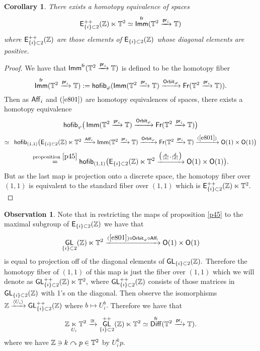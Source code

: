 \documentclass{amsart}
\newtheorem{cor}[theorem]{Corollary}
\theoremstyle{definition}
\newtheorem{observation}[theorem]{Observation}
\theoremstyle{remark}
\DeclareMathOperator{\pr}{\mathsf{pr}}
\newcommand{\lacts}{\curvearrowright}
\DeclareMathOperator{\Diff}{{\sf Diff}}
\DeclareMathOperator{\fr}{\sf fr}
\newcommand{\lag}{\langle}
\newcommand{\rag}{\rangle}
\newcommand{\xra}{\xrightarrow}
\DeclareMathOperator{\GL}{\sf GL}
\DeclareMathOperator{\Fr}{\sf Fr}
\DeclareMathOperator{\Imm}{\sf Imm}
\begin{document}
\begin{cor}
There exists a homotopy equivalence of spaces 
\[
{\sf E}_{\{i\} \subset 2}^{++}(\ZZ) \ltimes \TT^{2} \simeq \Imm^{\sf fr}(\TT^2 \xra{\pr_i} \TT) 
\]
where ${\sf E}_{\{i\} \subset 2}^{++}(\mathbb Z)$ are those elements of ${\sf E}_{\{i\} \subset 2}(\mathbb Z)$ whose diagonal elements are positive.
\end{cor}
 \begin{proof}
 We have that $\Imm^{\sf fr}(\TT^2 \xra{\pr_i} \TT)$ is defined to be the homotopy fiber
 \[
\Imm^{\sf fr}(\TT^2 \xra{\pr_i} \TT) := {\sf hofib}_{\varphi}(\Imm(\TT^2 \xra{\pr_i} \TT) \xra{{\sf Orbit}_{\varphi}} \Fr(\TT^2 \xra{\pr_i} \TT)).
\]
Then as ${\sf Aff}_{i}$ and $(\ref{e801})$ are homotopy equivalences of spaces, there exists a homotopy equivalence 
\[
{\sf hofib}_{\varphi}\big(\Imm(\TT^2 \xra{\pr_i} \TT) \xra{{\sf Orbit}_{\varphi}} \Fr(\TT^2 \xra{\pr_i} \TT)\big) 
\] 
\[
\simeq \hspace{5pt} {\sf hofib}_{(1,1)}\big({\sf E}_{\{i\} \subset 2}(\ZZ) \ltimes \TT^{2} \xra{{\sf Aff}_{i}} \Imm(\TT^2 \xra{\pr_i} \TT) \xra{{\sf Orbit}_{\varphi}} \Fr(\TT^2 \xra{\pr_i} \TT) \xra{(\ref{e801})} {\sf O}(1) \times {\sf O}(1)\big) 
\]
\[
\overset{\text{proposition }\ref{p45}}= {\sf hofib}_{(1,1)}\big({\sf E}_{\{i\} \subset 2}(\ZZ) \ltimes \TT^{2} \xra{\left(\frac{a}{|a|}, \frac{d}{|d|}\right)} {\sf O}(1) \times {\sf O}(1)\big).
\]
But as the last map is projection onto a discrete space, the homotopy fiber over $(1, 1)$ is equivalent to the standard fiber over $(1, 1)$ which is ${\sf E}_{\{i\} \subset 2}^{++}(\mathbb Z) \ltimes \mathbb T^{2}.$
\end{proof}
 
 
 \begin{observation} \label{t14}
Note that in restricting the maps of proposition \ref{p45} to the maximal subgroup of ${\sf E}_{\{i\} \subset 2}(\mathbb Z)$ we have that $$\GL_{\{i\} \subset 2}(\ZZ) \ltimes \TT^{2} \xra{(\ref{e801}) \circ {\sf Orbit}_{\varphi} \circ {\sf Aff_{i}}} {\sf O}(1) \times {\sf O}(1)$$ is equal to projection off of the diagonal elements of $\GL_{\{i\} \subset 2}(\ZZ).$ Therefore the homotopy fiber of $(1, 1)$ of this map is just the fiber over $(1, 1)$ which we will denote as $\GL_{\{i\} \subset 2}^{++}(\ZZ) \ltimes \TT^{2},$ where $\GL_{\{i\} \subset 2}^{++}(\ZZ)$ consists of those matrices in $\GL_{\{i\} \subset 2}(\ZZ)$ with 1's on the diagonal. Then observe the isomorphisms $\ZZ \xra{\lag U_{i} \rag} \GL_{\{i\} \subset 2}^{++}(\ZZ)$ where $b \mapsto U_{i}^{b}.$ Therefore we have that 
\[
\ZZ \underset{U_{i}}\ltimes \TT^{2} \xra{\cong} \GL_{\{i\} \subset 2}^{++}(\ZZ) \ltimes \TT^{2} \simeq  
\Diff^{\fr}(\TT^2 \xra{\pr_i} \TT).
\]
where we have $\ZZ \ni k \lacts p \in \TT^{2}$ by $U_{i}^{k}p.$ 
 
\end{observation}
 
\end{document}
